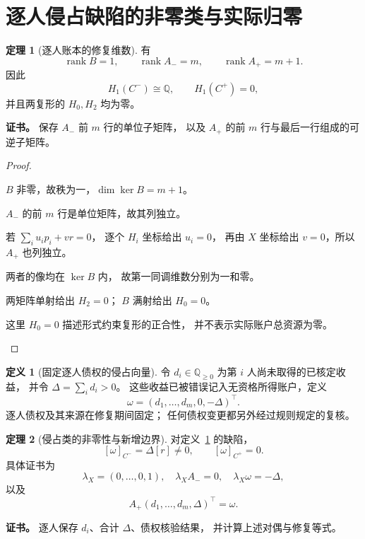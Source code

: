 \documentclass[UTF8,12pt,a4paper,openany,fontset=none,zihao=false]{ctexrep}
\theoremstyle{definition}
\newtheorem{definition}{定义}[chapter]
\newtheorem{theorem}{定理}[chapter]
\newenvironment{certificate}{\par\noindent\textbf{证书。}\ignorespaces}{\par}
\newcommand{\1}{\mathbf 1}
\begin{document}
\section{逐人侵占缺陷的非零类与实际归零}
\begin{theorem}[逐人账本的修复维数]
\label{r:ranks}
有
\[
\operatorname{rank}B=1,\qquad
\operatorname{rank}A_-=m,\qquad
\operatorname{rank}A_+=m+1.
\]
因此
\[
H_1(C^-)\cong\mathbb Q,\qquad H_1(C^+)=0,
\]
并且两复形的 \(H_0,H_2\) 均为零。
\end{theorem}
\begin{certificate}
保存 \(A_-\) 前 \(m\) 行的单位子矩阵，
以及 \(A_+\) 的前 \(m\) 行与最后一行组成的可逆子矩阵。
\end{certificate}
\begin{proof}
\begin{semanticsteps}
\item \(B\) 非零，故秩为一，\(\dim\ker B=m+1\)。
\item \(A_-\) 的前 \(m\) 行是单位矩阵，故其列独立。
\item 若 \(\sum_i u_ip_i+vr=0\)，
逐个 \(H_i\) 坐标给出 \(u_i=0\)，
再由 \(X\) 坐标给出 \(v=0\)，所以 \(A_+\) 也列独立。
\item 两者的像均在 \(\ker B\) 内，
故第一同调维数分别为一和零。
\item 两矩阵单射给出 \(H_2=0\)；
\(B\) 满射给出 \(H_0=0\)。
\item 这里 \(H_0=0\) 描述形式约束复形的正合性，
并不表示实际账户总资源为零。
\end{semanticsteps}
\end{proof}
\begin{definition}[固定逐人债权的侵占向量]
\label{r:claim}
令 \(d_i\in\mathbb Q_{\ge0}\) 为第 \(i\) 人尚未取得的已核定收益，
并令 \(\Delta=\sum_i d_i>0\)。
这些收益已被错误记入无资格所得账户，定义
\[
\omega=(d_1,\ldots,d_m,0,-\Delta)^\top.
\]
逐人债权及其来源在修复期间固定；
任何债权变更都另外经过规则规定的复核。
\end{definition}
\begin{theorem}[侵占类的非零性与新增边界]
\label{r:obstruction}
对定义~\ref{r:claim} 的缺陷，
\[
[\omega]_{C^-}=\Delta[r]\ne0,\qquad
[\omega]_{C^+}=0.
\]
具体证书为
\[
\lambda_X=(0,\ldots,0,1),\quad
\lambda_XA_-=0,\quad
\lambda_X\omega=-\Delta,
\]
以及
\[
A_+(d_1,\ldots,d_m,\Delta)^\top=\omega.
\]
\end{theorem}
\begin{certificate}
逐人保存 \(d_i\)、合计 \(\Delta\)、债权核验结果，
并计算上述对偶与修复等式。
\end{certificate}
\end{document}
